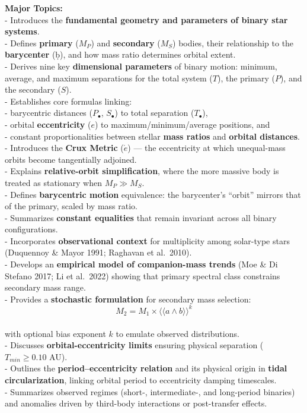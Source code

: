 \documentclass[
  letterpaper,
]{book}
\begin{document}
\textbf{Major Topics:}\\
- Introduces the \textbf{fundamental geometry and parameters of binary
star systems}.\\
- Defines \textbf{primary} (\(M_P\)) and \textbf{secondary} (\(M_S\))
bodies, their relationship to the \textbf{barycenter} (ḅ), and how mass
ratio determines orbital extent.\\
- Derives nine key \textbf{dimensional parameters} of binary motion:
minimum, average, and maximum separations for the total system (\(T\)),
the primary (\(P\)), and the secondary (\(S\)).\\
- Establishes core formulas linking:\\
- barycentric distances (\(P_\bullet\), \(S_\bullet\)) to total
separation (\(T_\bullet\)),\\
- orbital \textbf{eccentricity} (\(e\)) to maximum/minimum/average
positions, and\\
- constant proportionalities between stellar \textbf{mass ratios} and
\textbf{orbital distances}.\\
- Introduces the \textbf{Crux Metric} (\(\acute{e}\)) --- the
eccentricity at which unequal-mass orbits become tangentially
adjoined.\\
- Explains \textbf{relative-orbit simplification}, where the more
massive body is treated as stationary when \(M_P \gg M_S\).\\
- Defines \textbf{barycentric motion} equivalence: the barycenter's
``orbit'' mirrors that of the primary, scaled by mass ratio.\\
- Summarizes \textbf{constant equalities} that remain invariant across
all binary configurations.\\
- Incorporates \textbf{observational context} for multiplicity among
solar-type stars (Duquennoy \& Mayor 1991; Raghavan et al.~2010).\\
- Develops an \textbf{empirical model of companion-mass trends} (Moe \&
Di Stefano 2017; Li et al.~2022) showing that primary spectral class
constrains secondary mass range.\\
- Provides a \textbf{stochastic formulation} for secondary mass
selection:\\
\[M_2 = M_1 \times ⟨⟨a ∧ b⟩⟩^{k}\]\\
with optional bias exponent \(k\) to emulate observed distributions.\\
- Discusses \textbf{orbital-eccentricity limits} ensuring physical
separation (\(T_{min} ≥ 0.10\) AU).\\
- Outlines the \textbf{period--eccentricity relation} and its physical
origin in \textbf{tidal circularization}, linking orbital period to
eccentricity damping timescales.\\
- Summarizes observed regimes (short-, intermediate-, and long-period
binaries) and anomalies driven by third-body interactions or
post-transfer effects.
\end{document}

